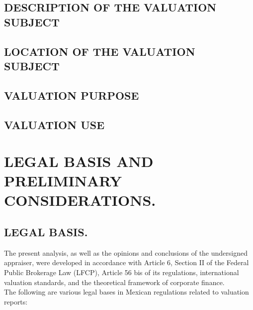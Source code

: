 \documentclass[10pt,letter]{report}
\begin{document}
\section{DESCRIPTION OF THE VALUATION SUBJECT}\label{sec:f}


\section{LOCATION OF THE VALUATION SUBJECT}\label{sec:g}

\section{VALUATION PURPOSE}\label{sec:h}

\section{VALUATION USE}\label{sec:i}


\newpage

\chapter{LEGAL BASIS AND PRELIMINARY CONSIDERATIONS.}\label{cap:3}
\thispagestyle{fancy}
\setcounter{section}{9}

\section*{LEGAL BASIS.}\label{sec:juridico}
The present analysis, as well as the opinions and conclusions of the undersigned appraiser, were developed in accordance with Article 6, Section II of the Federal Public Brokerage Law (LFCP), Article 56 bis of its regulations, international valuation standards, and the theoretical framework of corporate finance.\\

The following are various legal bases in Mexican regulations related to valuation reports:\\





\end{document}
